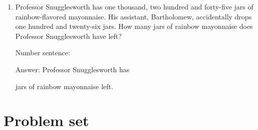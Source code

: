 \documentclass{tufte-book}
\begin{document}
\begin{enumerate}
  \item Professor Snugglesworth has one thousand, two hundred and forty-five jars of rainbow-flavored mayonnaise.
  His assistant, Bartholomew, accidentally drops one hundred and twenty-six jars.
  How many jars of rainbow mayonnaise does Professor Snugglesworth have left?\bigskip\par
  Number sentence: \dotfill\medskip\par
  Answer: Professor Snugglesworth has 
  \dotfill\bigskip\par\mbox{}\dotfill\bigskip\par\mbox{}\dotfill\bigskip
   jars of rainbow mayonnaise left.
\end{enumerate}

\clearpage\section{Problem set }
\end{document}
